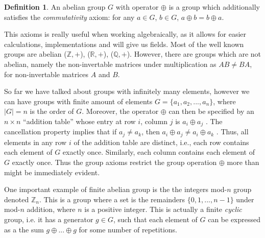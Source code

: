 \documentclass{Resources/UoBLab1}
\theoremstyle{definition}
\newtheorem{definition}[theorem]{Definition}
\begin{document}
\begin{definition}
    An abelian group $G$ with operator $\oplus$ is a group which additionally satisfies the \textit{commutativity} axiom: for any $a \in G$, $b \in G$, $a \oplus b = b \oplus a$.
\end{definition}
This axioms is really useful when working algebraically, as it allows for easier calculations, implementations and will give us fields. Most of the well known groups are abelian ($\mathbb{Z}, +$), ($\mathbb{R}, +$), ($\mathbb{Q}, +$). However, there are groups which are not abelian, namely the non-invertable matrices under multiplication as $AB \ne BA$, for non-invertable matrices $A$ and $B$.

So far we have talked about groups with infinitely many elements, however we can have groups with finite amount of elements $G = \{a_1 , a_2, ..., a_n\}$, where $|G| = n$ is the order of $G$. Moreover, the operator $\oplus$ can then be specified by an $n \times n$ “addition table” whose entry at row $i$, column $j$ is $a_i \oplus a_j$ . The cancellation property implies that if $a_j \ne a_k$, then $a_i \oplus a_j \ne a_i \oplus a_k$ . Thus, all elements in any row $i$ of the addition table are distinct, i.e., each row contains each element of $G$ exactly once. Similarly, each column contains each element of $G$ exactly once. Thus the group axioms restrict the group operation $\oplus$ more than might be immediately evident.

One important example of finite abelian group is the the integers mod-$n$ group denoted $\mathbb{Z}_n$. This is a group where a set is the remainders $\{0, 1, ..., n - 1\}$ under mod-$n$ addition, where $n$ is a positive integer. This is actually a finite \textit{cyclic} group, i.e. it has a generator $g \in G$, such that each element of $G$ can be expressed as a the sum $g\oplus ... \oplus g$ for some number of repetitions.
\end{document}

